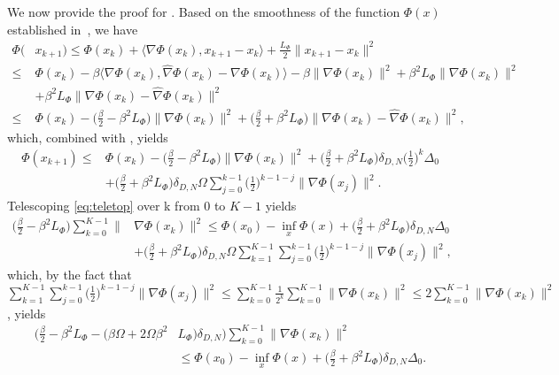 \documentclass{osudissert96}
\begin{document}
We now provide the proof for . 
Based on the smoothness of the function $\Phi(x)$ established in~, we have 
\begin{align}\label{eq:intimidern_pre}
\Phi(&x_{k+1}) \leq  \Phi(x_k)  + \langle \nabla \Phi(x_k), x_{k+1}-x_k\rangle + \frac{L_\Phi}{2} \|x_{k+1}-x_k\|^2 \nonumber
\\\leq& \Phi(x_k)  - \beta \langle \nabla \Phi(x_k),\widehat \nabla \Phi(x_k)- \nabla \Phi(x_k)\rangle -\beta\| \nabla \Phi(x_k)\|^2 + \beta^2 L_\Phi \|\nabla\Phi(x_k)\|^2\nonumber
\\&+\beta^2 L_\Phi\|\nabla\Phi(x_k)-\widehat \nabla\Phi(x_k)\|^2\nonumber
\\\leq&\Phi(x_k) -\Big(\frac{\beta}{2}-\beta^2 L_\Phi \Big)\| \nabla \Phi(x_k)\|^2 +\Big(\frac{\beta}{2}+\beta^2 L_\Phi\Big)\|\nabla\Phi(x_k)-\widehat \nabla\Phi(x_k)\|^2,
\end{align}
which, combined with , yields
\begin{align}\label{eq:teletop}
\Phi(x_{k+1}) \leq &\Phi(x_k) -\Big(\frac{\beta}{2}-\beta^2 L_\Phi \Big)\| \nabla \Phi(x_k)\|^2 + \Big(\frac{\beta}{2}+\beta^2 L_\Phi\Big)
\delta_{D,N}\Big(\frac{1}{2}\Big)^k  \Delta_0 \nonumber
\\&+ \Big(\frac{\beta}{2}+\beta^2 L_\Phi\Big)\delta_{D,N}\Omega\sum_{j=0}^{k-1}\Big(\frac{1}{2}\Big)^{k-1-j}\|\nabla \Phi(x_{j})\|^2.
\end{align}
Telescoping \cref{eq:teletop} over k from $0$ to $K-1$ yields
\begin{align*}
\Big(\frac{\beta}{2}-\beta^2 L_\Phi \Big) \sum_{k=0}^{K-1}\| &\nabla \Phi(x_k)\|^2 \leq \Phi(x_0) - \inf_x\Phi(x) + \Big(\frac{\beta}{2}+\beta^2 L_\Phi\Big) \delta_{D,N} \Delta_0\nonumber
\\&+ \Big(\frac{\beta}{2}+\beta^2 L_\Phi\Big)\delta_{D,N}\Omega\sum_{k=1}^{K-1}\sum_{j=0}^{k-1}\Big(\frac{1}{2}\Big)^{k-1-j}\|\nabla \Phi(x_{j})\|^2,
\end{align*}
which, by  the fact that {\small $\sum_{k=1}^{K-1}\sum_{j=0}^{k-1}\Big(\frac{1}{2}\Big)^{k-1-j}\|\nabla \Phi(x_{j})\|^2 \leq \sum_{k=0}^{K-1}\frac{1}{2^k}\sum_{k=0}^{K-1}\|\nabla \Phi(x_{k})\|^2\leq 2\sum_{k=0}^{K-1}\|\nabla \Phi(x_{k})\|^2$}, yields
\begin{align}\label{jkunisas}
\Big(\frac{\beta}{2}-\beta^2 L_\Phi -\big(\beta\Omega+2\Omega\beta^2 &L_\Phi\big)\delta_{D,N}\Big) \sum_{k=0}^{K-1}\| \nabla \Phi(x_k)\|^2  \nonumber
\\&\leq \Phi(x_0) - \inf_x\Phi(x) + \Big(\frac{\beta}{2}+\beta^2 L_\Phi\Big) \delta_{D,N} \Delta_0. 
\end{align}
\end{document}
